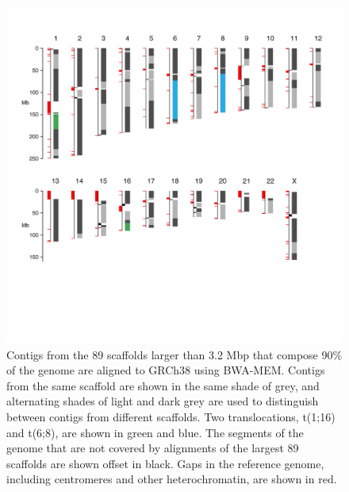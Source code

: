 \documentclass[
  12pt,
  oneside,
  openany]{book}
\begin{document}
\begin{figure}
\hypertarget{fig:ideogram}{%
\centering
\includegraphics{abyss2/ideogram.png}
\caption[Contigs from the 89 scaffolds larger than 3.2 Mbp that compose 90\% of the genome are aligned to GRCh38 using BWA-MEM.]{Contigs from the 89 scaffolds larger than 3.2 Mbp that compose 90\% of the genome are aligned to GRCh38 using BWA-MEM. Contigs from the same scaffold are shown in the same shade of grey, and alternating shades of light and dark grey are used to distinguish between contigs from different scaffolds. Two translocations, t(1;16) and t(6;8), are shown in green and blue. The segments of the genome that are not covered by alignments of the largest 89 scaffolds are shown offset in black. Gaps in the reference genome, including centromeres and other heterochromatin, are shown in red.}\label{fig:ideogram}
}
\end{figure}
\end{document}
